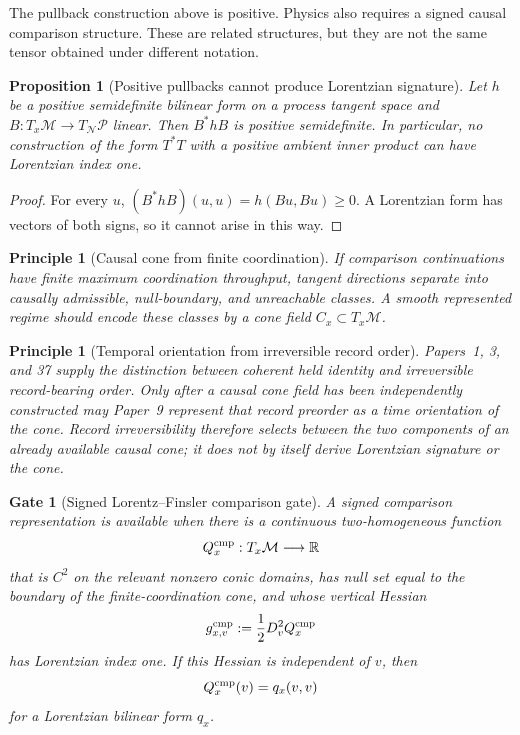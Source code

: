 \documentclass[11pt]{article}
\newtheorem{proposition}[theorem]{Proposition}
\newtheorem{principle}[theorem]{Principle}
\newtheorem{gate}[theorem]{Gate}
\theoremstyle{remark}
\newcommand{\Mgeom}{\mathcal M}
\newcommand{\Pproc}{\mathcal P}
\newcommand{\Qcmp}{Q^{\rm cmp}}
\begin{document}
The pullback construction above is positive.  Physics also requires a signed causal comparison structure.  These are related structures, but they are not the same tensor obtained under different notation.

\begin{proposition}[Positive pullbacks cannot produce Lorentzian signature]
\label{prop:positive-pullback-no-lorentz}
Let $h$ be a positive semidefinite bilinear form on a process tangent space and $B:T_x\Mgeom\to T_{\mathcal N}\Pproc$ linear.  Then $B^*hB$ is positive semidefinite.  In particular, no construction of the form $T^*T$ with a positive ambient inner product can have Lorentzian index one.
\end{proposition}

\begin{proof}
For every $u$, $(B^*hB)(u,u)=h(Bu,Bu)\ge0$.  A Lorentzian form has vectors of both signs, so it cannot arise in this way.
\end{proof}

\begin{principle}[Causal cone from finite coordination]
If comparison continuations have finite maximum coordination throughput, tangent directions separate into causally admissible, null-boundary, and unreachable classes.  A smooth represented regime should encode these classes by a cone field $C_x\subset T_x\Mgeom$.
\end{principle}

\begin{principle}[Temporal orientation from irreversible record order]
Papers~1, 3, and 37 supply the distinction between coherent held identity and irreversible record-bearing order.  Only after a causal cone field has been independently constructed may Paper~9 represent that record preorder as a time orientation of the cone.  Record irreversibility therefore selects between the two components of an already available causal cone; it does not by itself derive Lorentzian signature or the cone.
\end{principle}

\begin{gate}[Signed Lorentz--Finsler comparison gate]
\label{gate:signed-comparison}
A signed comparison representation is available when there is a continuous two-homogeneous function
\[
        \Qcmp_x:T_x\Mgeom\longrightarrow\mathbb R
\]
that is $C^2$ on the relevant nonzero conic domains, has null set equal to the boundary of the finite-coordination cone, and whose vertical Hessian
\[
        g^{\rm cmp}_{x,v}
        :=\frac12D_v^2\Qcmp_x
\]
has Lorentzian index one.  If this Hessian is independent of $v$, then
\[
        \Qcmp_x(v)=q_x(v,v)
\]
for a Lorentzian bilinear form $q_x$.
\end{gate}
\end{document}
